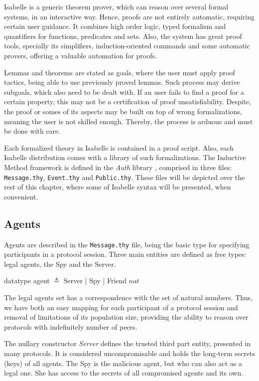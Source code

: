 Isabelle is a generic theorem prover, which can reason over several formal systems, in an interactive way. Hence, proofs are not entirely automatic, requiring certain user guidance. It combines high order logic, typed formalism and quantifiers for functions, predicates and sets. Also, the system has great proof tools, specially its simplifiers, induction-oriented commands and some automatic provers, offering a valuable automation for proofs.

Lemmas and theorems are stated as goals, where the user must apply proof tactics, being able to use previously proved lemmas. Such process may derive subgoals, which also need to be dealt with. If an user fails to find a proof for a certain property, this may not be a certification of proof unsatisfiability. Despite, the proof or somes of its aspects may be built on top of wrong formalizations, meaning the user is not skilled enough. Thereby, the process is arduous and must be done with care.

Each formalized theory in Isabelle is contained in a proof script. Also, each Isabelle distribution comes with a library of such formalizations. The Inductive Method framework is defined in the \textit{Auth} library \cite{isabelle-hol-auth}, comprised in three files: \texttt{Message.thy}, \texttt{Event.thy} and \texttt{Public.thy}. These files will be depicted over the rest of this chapter, where some of Isabelle syntax will be presented, when convenient.



\subsection{Agents}
Agents are described in the \texttt{Message.thy} file, being the basic type for specifying participants in a protocol session. Three main entities are defined as free types: legal agents, the Spy and the Server.

\begin{center}
  {\ttfamily datatype agent $\triangleq$ Server | Spy | Friend $nat$}
\end{center}

The legal agents set has a correspondence with the set of natural numbers. Thus, we have both an easy mapping for each participant of a protocol session and removal of limitations of its population size, providing the ability to reason over protocols with indefinitely number of peers.

The nullary constructor \textit{Server} defines the trusted third part entity, presented in many protocols. It is considered uncompromisable and holds the long-term secrets (keys) of all agents. The Spy is the malicious agent, but who can also act as a legal one. She has access to the secrets of all compromised agents and its own.



